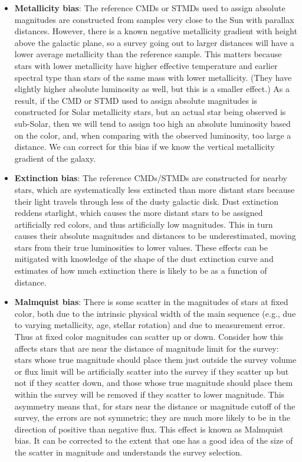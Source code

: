 \documentclass[a4paper,10pt]{article}
\begin{document}
\begin{itemize}
    \item \textbf{Metallicity bias}: The reference CMDs or STMDs used to assign absolute magnitudes are constructed from samples very close to the Sun with parallax distances. However, there is a known negative metallicity gradient with height above the galactic plane, so a survey going out to larger distances will have a lower average metallicity than the reference sample. This matters because stars with lower metallicity have higher effective temperature and earlier spectral type than stars of the same mass with lower metallicity. (They have slightly higher absolute luminosity as well, but this is a smaller effect.) As a result, if the CMD or STMD used to assign absolute magnitudes is constructed for Solar metallicity stars, but an actual star being observed is sub-Solar, then we will tend to assign too high an absolute luminosity based on the color, and, when comparing with the observed luminosity, too large a distance. We can correct for this bias if we know the vertical metallicity gradient of the galaxy.
    \item \textbf{Extinction bias}: The reference CMDs/STMDs are constructed for nearby stars, which are systematically less extincted than more distant stars because their light travels through less of the dusty galactic disk. Dust extinction reddens starlight, which causes the more distant stars to be assigned artificially red colors, and thus artificially low magnitudes. This in turn causes their absolute magnitudes and distances to be underestimated, moving stars from their true luminosities to lower values. These effects can be mitigated with knowledge of the shape of the dust extinction curve and estimates of how much extinction there is likely to be as a function of distance.
    \item \textbf{Malmquist bias}: There is some scatter in the magnitudes of stars at fixed color, both due to the intrinsic physical width of the main sequence (e.g., due to varying metallicity, age, stellar rotation) and due to measurement error. Thus at fixed color magnitudes can scatter up or down. Consider how this affects stars that are near the distance of magnitude limit for the survey: stars whose true magnitude should place them just outside the survey volume or flux limit will be artificially scatter into the survey if they scatter up but not if they scatter down, and those whose true magnitude should place them within the survey will be removed if they scatter to lower magnitude. This asymmetry means that, for stars near the distance or magnitude cutoff of the survey, the errors are not symmetric; they are much more likely to be in the direction of positive than negative flux. This effect is known as Malmquist bias. It can be corrected to the extent that one has a good idea of the size of the scatter in magnitude and understands the survey selection.

\end{itemize}
\end{document}
